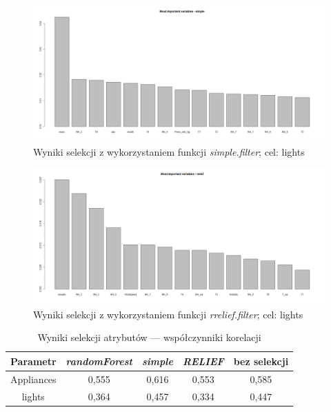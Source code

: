\documentclass[a4paper,11pt,twoside]{mwrep}  %
\begin{document}
 \begin{figure}[!h]
    \centering \includegraphics[scale=0.3]{../simpleSelection_lights.png}
    \caption{Wyniki selekcji z wykorzystaniem funkcji \textit{simple.filter}; cel: lights}
    \label{fig:simpleSelection}
\end{figure}

 \begin{figure}[!h]
    \centering \includegraphics[scale=0.3]{../reliefSelection_lights.png}
    \caption{Wyniki selekcji z wykorzystaniem  funkcji \textit{rrelief.filter}; cel: lights}
    \label{fig:reliefSelection}
\end{figure}


\begin{table}[!h]  \centering
\caption{Wyniki selekcji atrybutów --- współczynniki korelacji}
\begin{tabular} { c  c  c  c  c } \hline \hline
    \textbf{Parametr} & \textbf{\textit{randomForest}} & \textbf{\textit{simple}} & \textbf{\textit{RELIEF}} & \textbf{bez selekcji}  \\ \hline
    Appliances & 0,555 & 0,616 & 0,553 & 0,585 \\
    lights & 0,364 & 0,457 & 0,334 & 0,447 \\
    \hline \hline
    
\end{tabular}
\label{table:wynikiSelekcji}
\end{table}
\end{document}
